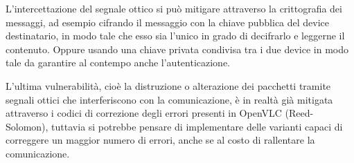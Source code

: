L'intercettazione del segnale ottico si può mitigare attraverso la crittografia dei messaggi, ad esempio cifrando il messaggio con la chiave pubblica del device destinatario, in modo tale che esso sia l'unico in grado di decifrarlo e leggerne il contenuto. Oppure usando una chiave privata condivisa tra i due device in modo tale da garantire al contempo anche l'autenticazione.

L'ultima vulnerabilità, cioè la distruzione o alterazione dei pacchetti tramite segnali ottici che interferiscono con la comunicazione, è in realtà già mitigata attraverso i codici di correzione degli errori presenti in OpenVLC (Reed-Solomon), tuttavia si potrebbe pensare di implementare delle varianti capaci di correggere un maggior numero di errori, anche se al costo di rallentare la comunicazione.